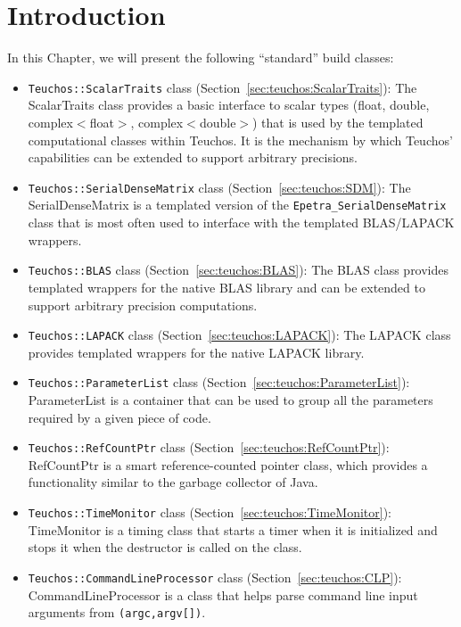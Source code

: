 \section{Introduction}

In this Chapter, we will present the following ``standard'' build classes:
\begin{itemize}

\item \verb!Teuchos::ScalarTraits! class (Section~\ref{sec:teuchos:ScalarTraits}):
  The ScalarTraits class provides a basic interface to scalar types (float, double, 
  complex$<$float$>$, complex$<$double$>$) that is used by the templated computational
  classes within Teuchos.  It is the mechanism by which Teuchos' capabilities 
  can be extended to support arbitrary precisions.

\item \verb!Teuchos::SerialDenseMatrix! class (Section~\ref{sec:teuchos:SDM}): 
  The SerialDenseMatrix is a templated version of the \verb!Epetra_SerialDenseMatrix! class
  that is most often used to interface with the templated BLAS/LAPACK wrappers.

\item \verb!Teuchos::BLAS! class (Section~\ref{sec:teuchos:BLAS}):
  The BLAS class provides templated wrappers
  for the native BLAS library and can be extended to support arbitrary precision
  computations.  

\item \verb!Teuchos::LAPACK! class (Section~\ref{sec:teuchos:LAPACK}):
  The LAPACK class provides templated wrappers for the native LAPACK library.

\item \verb!Teuchos::ParameterList! class (Section~\ref{sec:teuchos:ParameterList}):
  ParameterList is a container that can be used to group all the parameters required by a
  given piece of code.

\item \verb!Teuchos::RefCountPtr! class (Section~\ref{sec:teuchos:RefCountPtr}):
  RefCountPtr is a smart reference-counted pointer class, which provides a functionality
  similar to the garbage collector of Java. 

\item \verb!Teuchos::TimeMonitor! class (Section~\ref{sec:teuchos:TimeMonitor}):
  TimeMonitor is a timing class that starts a timer when it is initialized and
  stops it when the destructor is called on the class.

\item \verb!Teuchos::CommandLineProcessor! class (Section~\ref{sec:teuchos:CLP}): 
  CommandLineProcessor is a class that helps parse command line input arguments from 
  \verb!(argc,argv[])!.   
\end{itemize}

